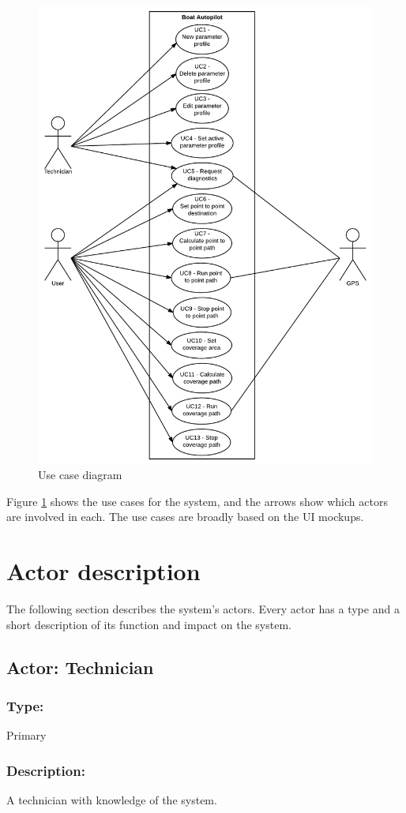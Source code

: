 \begin{figure}[H]
	\centering
	\includegraphics[width=0.9\linewidth]{Images/Requirements_specification/Usecase_diagram}
	\caption{Use case diagram}
	\label{fig:usecasediagram}
\end{figure}

Figure \ref{fig:usecasediagram} shows the use cases for the system, and the arrows show which actors are involved in each. The use cases are broadly based on the UI mockups.

\section{Actor description}
The following section describes the system's actors. Every actor has a type and a short description of its function and impact on the system.

\begin{framed}
	\subsection{Actor: Technician}
	\subsubsection*{Type:}
	Primary
	
	\subsubsection*{Description:}
	A technician with knowledge of the system.
	
\end{framed}

